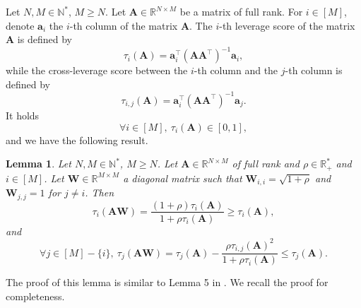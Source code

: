 \documentclass[twoside,11pt]{book}
\newtheorem{lemma}{Lemma}
\numberwithin{theorem}{chapter}
\numberwithin{definition}{chapter}
\numberwithin{proposition}{chapter}
\numberwithin{corollary}{chapter}
\numberwithin{example}{chapter}
\numberwithin{lemma}{chapter}
\numberwithin{assumption}{chapter}
\numberwithin{equation}{chapter}
\numberwithin{figure}{chapter}
\DeclareMathOperator{\Tran}{\intercal}
\begin{document}
Let $N,M \in \mathbb{N}^{*}$, $M \geq N$. Let $\bm{A} \in \mathbb{R}^{N \times M}$ be a matrix of full rank.
For $i \in [M]$, denote $\bm{a}_{i}$ the $i$-th column of the matrix $\bm{A}$. The $i$-th leverage score of the matrix $\bm{A}$ is defined by
\begin{equation}\label{eq:def_matrix_leverage_score}
\tau_{i}(\bm{A}) = \bm{a}_{i}^{\Tran} (\bm{A}\bm{A}^{\Tran})^{-1}\bm{a}_{i},
\end{equation}
while the cross-leverage score between the $i$-th column and the $j$-th column is defined by
\begin{equation}
\tau_{i,j}(\bm{A}) = \bm{a}_{i}^{\Tran} (\bm{A}\bm{A}^{\Tran})^{-1}\bm{a}_{j}.
\end{equation}
It holds \parencite{DrMaMu06}
\begin{equation}\label{eq:bounds_on_lv_scores}
\forall i \in [M], \: \tau_{i}(\bm{A}) \in [0,1],
\end{equation}
and we have the following result.
\begin{lemma}\label{lemma:rank1_leverage_score}
Let $N,M \in \mathbb{N}^{*}$, $M \geq N$. Let $\bm{A} \in \mathbb{R}^{N \times M}$ of full rank and $\rho \in \mathbb{R}_{+}^{*}$ and $i \in [M]$. Let $\bm{W} \in \mathbb{R}^{M \times M}$ a diagonal matrix such that $\bm{W}_{i,i} = \sqrt{1+\rho}$ and $\bm{W}_{j,j} = 1$ for $j \neq i$. Then
\begin{equation}\label{eq:lv_score_update}
\tau_{i}(\bm{A}\bm{W}) = \frac{(1+\rho)\tau_{i}(\bm{A})}{1+\rho \tau_{i}(\bm{A})} \geq \tau_{i}(\bm{A}),
\end{equation}
and
\begin{equation}\label{eq:cross_lv_score_update}
\forall j \in [M]-\{i\}, \: \tau_{j}(\bm{A}\bm{W}) = \tau_{j}(\bm{A}) -\frac{\rho \tau_{i,j}(\bm{A})^{2}}{1+\rho \tau_{i}(\bm{A})} \leq \tau_{j}(\bm{A}).
\end{equation}
\end{lemma}
The proof of this lemma is similar to Lemma 5 in \cite{Coh15}. We recall the proof for completeness.
\end{document}
